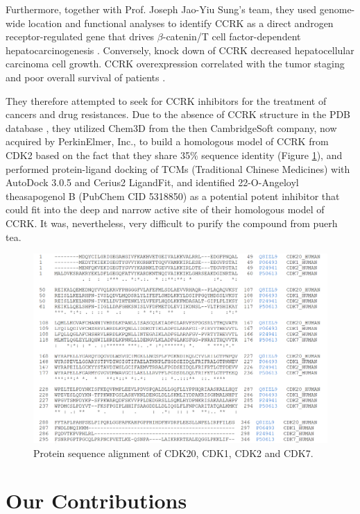 Furthermore, together with Prof. Joseph Jao-Yiu Sung's team, they used genome-wide location and functional analyses to identify CCRK as a direct androgen receptor-regulated gene that drives $\beta$-catenin/T cell factor-dependent hepatocarcinogenesis \citep{1146}. Conversely, knock down of CCRK decreased hepatocellular carcinoma cell growth. CCRK overexpression correlated with the tumor staging and poor overall survival of patients \citep{1146}.

They therefore attempted to seek for CCRK inhibitors for the treatment of cancers and drug resistances. Due to the absence of CCRK structure in the PDB database \citep{540,537}, they utilized Chem3D from the then CambridgeSoft company, now acquired by PerkinElmer, Inc., to build a homologous model of CCRK from CDK2 based on the fact that they share 35\% sequence identity (Figure \ref{Case:CDKAlignment}), and performed protein-ligand docking of TCMs (Traditional Chinese Medicines) with AutoDock 3.0.5 and Cerius2 LigandFit, and identified 22-O-Angeloyl theasapogenol B (PubChem CID 5318850) as a potential potent inhibitor that could fit into the deep and narrow active site of their homologous model of CCRK. It was, nevertheless, very difficult to purify the compound from puerh tea.

\begin{figure}
\centering
\includegraphics[width=\linewidth]{../ccrk/CDKAlignment.png}
\caption{Protein sequence alignment of CDK20, CDK1, CDK2 and CDK7.}
\label{Case:CDKAlignment}
\end{figure}

\section{Our Contributions}

